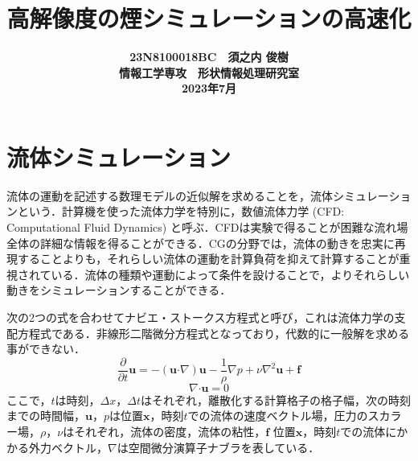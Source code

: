 \documentclass[10pt,a4paper,notitlepage,oneside,twocolumn]{abst_jsarticle}
\title{
{\bf 高解像度の煙シミュレーションの高速化}
}
\author{\begin{center}
{\large {\bf 23N8100018BC　須之内 俊樹}}\\
{\large {\bf 情報工学専攻　形状情報処理研究室}}\\
{\large {\bf 2023年7月}}
\end{center}}
\date{}
\begin{document}
\maketitle
\section{流体シミュレーション} \label{sec:intro}
流体の運動を記述する数理モデルの近似解を求めることを，流体シミュレーションという．計算機を使った流体力学を特別に，数値流体力学 (CFD: Computational Fluid Dynamics) と呼ぶ．CFDは実験で得ることが困難な流れ場全体の詳細な情報を得ることができる．CGの分野では，流体の動きを忠実に再現することよりも，それらしい流体の運動を計算負荷を抑えて計算することが重視されている．流体の種類や運動によって条件を設けることで，よりそれらしい動きをシミュレーションすることができる．

次の2つの式を合わせてナビエ・ストークス方程式と呼び，これは流体力学の支配方程式である．非線形二階微分方程式となっており，代数的に一般解を求める事ができない．
\begin{equation}\label{eq:Navie}
\frac{\partial}{\partial t}\bm{u} = - (\bm{u} \boldsymbol{\cdot}\nabla) \bm{u} - \frac{1}{\rho}\nabla p + \nu\nabla^2\bm{u} + \bm{f}
\end{equation}
$$\nabla\boldsymbol{\cdot}\bm{u} = 0$$
ここで，$t$は時刻，$\varDelta x，\varDelta t$はそれぞれ，離散化する計算格子の格子幅，次の時刻までの時間幅，$\bm{u}，p$は位置$\bm{x}$，時刻$t$での流体の速度ベクトル場，圧力のスカラー場，$\rho，\nu$はそれぞれ，流体の密度，流体の粘性，$\bm{f}$ 位置$\bm{x}$，時刻$t$での流体にかかる外力ベクトル，$\nabla$は空間微分演算子ナブラを表している．
\end{document}
